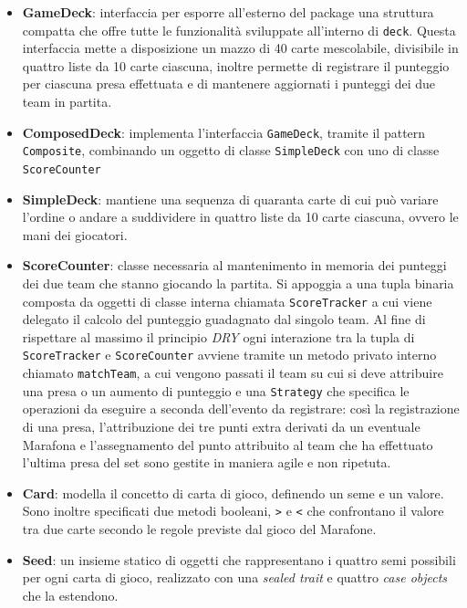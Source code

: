 \begin{itemize}

	\item{\textbf{GameDeck}}: interfaccia per esporre all'esterno del package una struttura compatta che offre tutte le funzionalità sviluppate all'interno di \texttt{deck}. Questa interfaccia mette a disposizione un mazzo di 40 carte mescolabile, divisibile in quattro liste da 10 carte ciascuna, inoltre permette di registrare il punteggio per ciascuna presa effettuata e di mantenere aggiornati i punteggi dei due team in partita.

	\item{\textbf{ComposedDeck}}: implementa l'interfaccia \texttt{GameDeck}, tramite il pattern \texttt{Composite}, combinando un oggetto di classe \texttt{SimpleDeck} con uno di classe \texttt{ScoreCounter}

	\item{\textbf{SimpleDeck}}: mantiene una sequenza di quaranta carte di cui può variare l'ordine o andare a suddividere in quattro liste da 10 carte ciascuna, ovvero le mani dei giocatori.

	\item{\textbf{ScoreCounter}}: classe necessaria al mantenimento in memoria dei punteggi dei due team che stanno giocando la partita. Si appoggia a una tupla binaria composta da oggetti di classe
	interna chiamata \texttt{ScoreTracker} a cui viene delegato il calcolo del punteggio guadagnato dal singolo team. Al fine di rispettare al massimo il principio \textit{DRY} ogni interazione tra la tupla di \texttt{ScoreTracker} e \texttt{ScoreCounter} avviene tramite un metodo privato interno chiamato \texttt{matchTeam}, a cui vengono passati il team su cui si deve attribuire una presa o un aumento di punteggio e una \texttt{Strategy} che specifica le operazioni da eseguire a seconda dell'evento da registrare: così la registrazione di una presa, l'attribuzione dei tre punti extra derivati da un eventuale Marafona e l'assegnamento del punto attribuito al team che ha effettuato l'ultima presa del set sono gestite in maniera agile e non ripetuta.

	\item{\textbf{Card}}: modella il concetto di carta di gioco, definendo un seme e un valore.
	Sono inoltre specificati due metodi booleani, \texttt{>} e \texttt{<} che confrontano il valore tra due carte secondo le regole previste dal gioco del Marafone.

	\item{\textbf{Seed}}: un insieme statico di oggetti che rappresentano i quattro semi possibili per ogni carta di gioco, realizzato con una \textit{sealed trait}  e quattro \textit{case objects} che la estendono.


\end{itemize}
